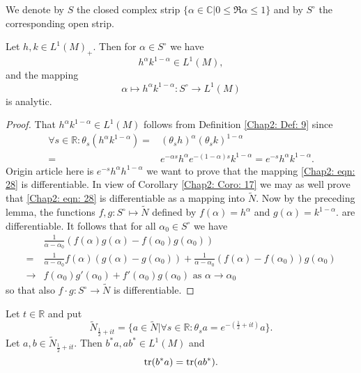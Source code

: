 We denote by $S$ the closed complex strip $\{\alpha\in \mathbb{C}|0\leq \Re \alpha\leq 1\}$ and by $S^\circ$ the corresponding open strip. \par
\begin{lemma}\label{Chap2: Lemma: 19}
    Let $h,k\in L^1(M)_+$. Then for $\alpha\in S^\circ$ we have
    \[
        h^\alpha k^{1-\alpha}\in L^1(M),
    \]
    and the mapping
    \begin{equation}\label{Chap2: eqn: 28}
        \alpha\mapsto h^\alpha k^{1-\alpha}: S^\circ \to L^1(M)
    \end{equation}
    is analytic.
\end{lemma}
\begin{proof}
    That $ h^\alpha k^{1-\alpha}\in L^1(M)$ follows from Definition \ref{Chap2: Def: 9} since
    \[
        \begin{split}
            \forall s\in \mathbb{R}: \theta_s(h^\alpha k^{1-\alpha})=&(\theta_s h)^\alpha (\theta_s k)^{1-\alpha}\\
            =& e^{-\alpha s}h^\alpha e^{-(1-\alpha)s}k^{1-\alpha}=e^{-s}h^\alpha k^{1-\alpha}.
        \end{split}
    \]
    {\color{red} Origin article here is $e^{-s}h^\alpha h^{1-\alpha}$} we want to prove that the mapping \eqref{Chap2: eqn: 28} is differentiable. In view of Corollary \ref{Chap2: Coro: 17} we may as well prove that \eqref{Chap2: eqn: 28} is differentiable as a mapping into $\tilde{N}$. Now by the preceding lemma, the functions $f,g:S^\circ \mapsto \tilde{N}$ defined by $f(\alpha)=h^\alpha$ and $g(\alpha)=k^{1-\alpha}.$ are differentiable. It follows that for all $\alpha_0\in S^\circ$ we have
    \[
        \begin{split}
            &\frac{1}{\alpha-\alpha_0}(f(\alpha)g(\alpha)-f(\alpha_0)g(\alpha_0))\\
            =&\frac{1}{\alpha-\alpha_0}f(\alpha)(g(\alpha)-g(\alpha_0))+\frac{1}{\alpha-\alpha_0}(f(\alpha)-f(\alpha_0))g(\alpha_0)\\
            \to & f(\alpha_0)g'(\alpha_0)+f'(\alpha_0)g(\alpha_0) \text{ as } \alpha\to \alpha_0
        \end{split}
    \]
    so that also $f\cdot g: S^\circ \to \tilde{N}$ is differentiable.
\end{proof}
\begin{lemma}\label{Chap2: Lemma: 20}
    Let $t\in \mathbb{R}$ and put
    \begin{equation}\label{Chap2: eqn: 29}
        \tilde{N}_{\frac{1}{2}+it}=\{a\in \tilde{N}|\forall s\in \mathbb{R}: \theta_s a=e^{-(\frac{1}{2}+it)}a\}.
    \end{equation}
    Let $a,b\in \tilde{N}_{\frac{1}{2}+it}$. Then $b^*a, ab^*\in L^1(M)$ and
    \begin{equation}\label{Chap2: eqn: 30}
        \tr(b^*a)=\tr(ab^*).
    \end{equation}
\end{lemma}
